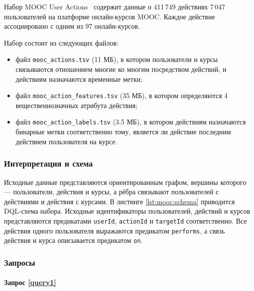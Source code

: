 Набор MOOC User Actions~\cite{mooc} содержит данные о 411\,749 действиях 7\,047 пользователей на платформе онлайн-курсов
MOOC. Каждое действие ассоциировано с одним из 97 онлайн-курсов.

Набор состоит из следующих файлов:
\begin{itemize}
  \item файл \texttt{mooc\_actions.tsv} (11 МБ), в котором пользователи и курсы связываются отношением многие ко многим
    посредством действий, и действиям назначаются временные метки;
  \item файл \texttt{mooc\_action\_features.tsv} (35 МБ), в котором определяются 4 вещественнозначных атрибута действия;
  \item файл \texttt{mooc\_action\_labels.tsv} (3.5 МБ), в котором действиям назначаются бинарные метки соответственно
    тому, является ли действие последним действием пользователя на курсе.
\end{itemize}

\subsubsection{Интерпретация и схема}

Исходные данные представляются ориентированным графом, вершины которого --- пользователи, действия и курсы, а рёбра
связывают пользователей с действиями и действия с курсами. В листинге \ref{lst:mooc:schema} приводится DQL-схема набора.
Исходные идентификаторы пользователей, действий и курсов представляются предикатами \texttt{userId}, \texttt{actionId} и
\texttt{targetId} соответственно. Все действия одного пользователя выражаются предикатом \texttt{performs}, а связь
действия и курса описывается предикатом \texttt{on}.


\subsubsection{Запросы}

\paragraph{Запрос \ref{query1}}


